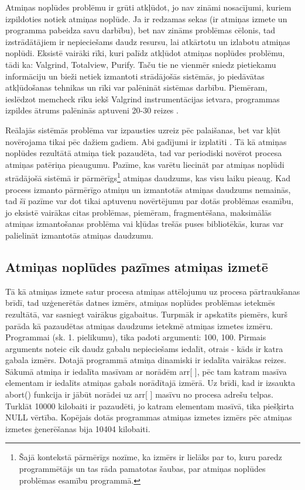 Atmiņas noplūdes problēmu ir grūti atkļūdot,  jo nav zināmi nosacījumi, kuriem izpildoties notiek atmiņas noplūde. 
Ja ir redzamas sekas (ir atmiņas izmete un programma pabeidza savu darbību), bet nav zināms problēmas cēlonis, tad izstrādātājiem ir nepieciešams daudz resursu, lai atkārtotu un izlabotu atmiņas noplūdi. 
Eksistē vairāki rīki, kuri palīdz atkļūdot atmiņas noplūdes problēmu, tādi ka: Valgrind, Totalview, Purify. 
Taču tie ne vienmēr sniedz pietiekamu informāciju un bieži netiek izmantoti strādājošās sistēmās, jo piedāvātas atkļūdošanas tehnikas un rīki var palēnināt sistēmas darbību.
Piemēram, ieslēdzot  memcheck rīku iekš Valgrind instrumentācijas ietvara, programmas izpildes ātrums palēninās aptuveni 20-30 reizes \cite{UVD}.

Reālajās sistēmās problēma var izpausties uzreiz pēc palaišanas, bet var kļūt novērojama tikai pēc dažiem gadiem. 
Abi gadījumi ir izplatīti \cite{HTTM}.
Tā kā atmiņas noplūdes rezultātā atmiņa tiek pazaudēta, tad var periodiski novērot procesa atmiņas patēriņa pieaugumu.
Pazīme, kas varētu liecināt par atmiņas noplūdi strādājošā sistēmā ir pārmērīgs\footnote{Šajā kontekstā pārmērīgs nozīme, ka izmērs ir lielāks par to, kuru paredz programmētājs un tas rāda pamatotas šaubas, par atmiņas noplūdes problēmas esamību programmā.}
atmiņas daudzums, kas visu laiku pieaug. 
Kad process izmanto pārmērīgo atmiņu un izmantotās atmiņas daudzums nemainās, tad šī pazīme var dot tikai aptuvenu novērtējumu par dotās problēmas esamību, jo eksistē vairākas citas problēmas, piemēram, fragmentēšana, maksimālās atmiņas izmantošanas problēma vai kļūdas trešās puses bibliotēkās, kuras var palielināt izmantotās atmiņas daudzumu.

\subsection{Atmiņas noplūdes pazīmes atmiņas izmetē}
Tā kā atmiņas izmete satur procesa atmiņas attēlojumu uz procesa pārtraukšanas brīdī, tad uzģenerētās datnes izmērs, atmiņas noplūdes problēmas ietekmēs rezultātā, var sasniegt vairākus gigabaitus.
Turpmāk ir apskatīts piemērs, kurš parāda kā pazaudētas atmiņas daudzums ietekmē atmiņas izmetes izmēru.
Programmai (sk. 1. pielikumu), tika padoti argumenti: 100, 100. 
Pirmais arguments noteic cik daudz gabalu nepieciešams iedalīt, otrais - kāds ir katra gabala izmērs.
Dotajā programmā atmiņa dinamiski ir iedalīta vairākas reizes. 
Sākumā atmiņa ir iedalīta masīvam ar norādēm arr[ ], pēc tam katram masīva elementam ir iedalīts atmiņas gabals norādītajā izmērā.
Uz brīdi, kad ir izsaukta abort() funkcija ir jābūt norādei uz arr[ ] masīvu no procesa adrešu telpas.
Turklāt 10000 kilobaiti ir pazaudēti, jo  katram elementam masīvā, tika piešķirta NULL vērtība. 
Kopējais dotās programmas atmiņas izmetes izmērs pēc atmiņas izmetes ģenerēšanas bija 10404 kilobaiti.

